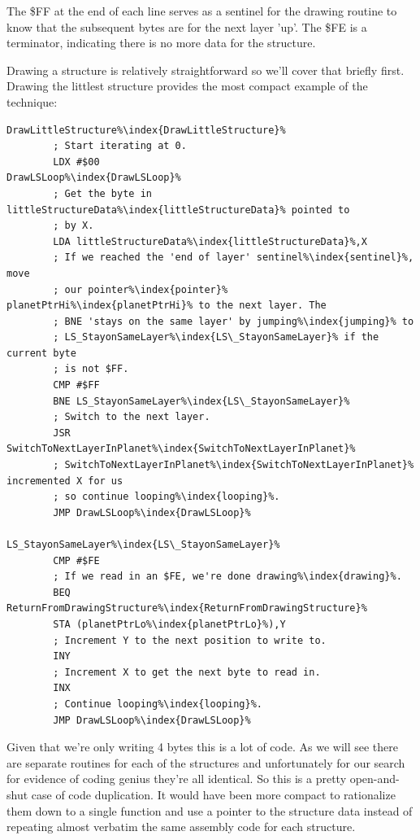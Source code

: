 The \$FF at the end of each line serves as a sentinel for the drawing routine to know that the subsequent bytes
are for the next layer 'up'. The \$FE is a terminator, indicating there is no more data for the structure.

Drawing a structure is relatively straightforward so we'll cover that briefly first. Drawing the littlest
structure provides the most compact example of the technique:

\begin{lstlisting}[caption=The littlest structure\index{structure} has only two layers.,escapechar=\%]
DrawLittleStructure%\index{DrawLittleStructure}%
        ; Start iterating at 0.
        LDX #$00
DrawLSLoop%\index{DrawLSLoop}%
        ; Get the byte in littleStructureData%\index{littleStructureData}% pointed to
        ; by X.
        LDA littleStructureData%\index{littleStructureData}%,X
        ; If we reached the 'end of layer' sentinel%\index{sentinel}%, move
        ; our pointer%\index{pointer}% planetPtrHi%\index{planetPtrHi}% to the next layer. The
        ; BNE 'stays on the same layer' by jumping%\index{jumping}% to
        ; LS_StayonSameLayer%\index{LS\_StayonSameLayer}% if the current byte
        ; is not $FF.
        CMP #$FF
        BNE LS_StayonSameLayer%\index{LS\_StayonSameLayer}%
        ; Switch to the next layer.
        JSR SwitchToNextLayerInPlanet%\index{SwitchToNextLayerInPlanet}%
        ; SwitchToNextLayerInPlanet%\index{SwitchToNextLayerInPlanet}% incremented X for us
        ; so continue looping%\index{looping}%.
        JMP DrawLSLoop%\index{DrawLSLoop}%

LS_StayonSameLayer%\index{LS\_StayonSameLayer}%   
        CMP #$FE
        ; If we read in an $FE, we're done drawing%\index{drawing}%.
        BEQ ReturnFromDrawingStructure%\index{ReturnFromDrawingStructure}%
        STA (planetPtrLo%\index{planetPtrLo}%),Y
        ; Increment Y to the next position to write to.
        INY
        ; Increment X to get the next byte to read in.
        INX
        ; Continue looping%\index{looping}%.
        JMP DrawLSLoop%\index{DrawLSLoop}%
\end{lstlisting}

Given that we're only writing 4 bytes this is a lot of code. As we will see there are separate routines for each
of the structures and unfortunately for our search for evidence of coding genius they're all identical. So this
is a pretty open-and-shut case of code duplication. It would have been more compact to rationalize them down to a single function
and use a pointer to the structure data instead of repeating almost verbatim the same assembly code for each
structure. 

